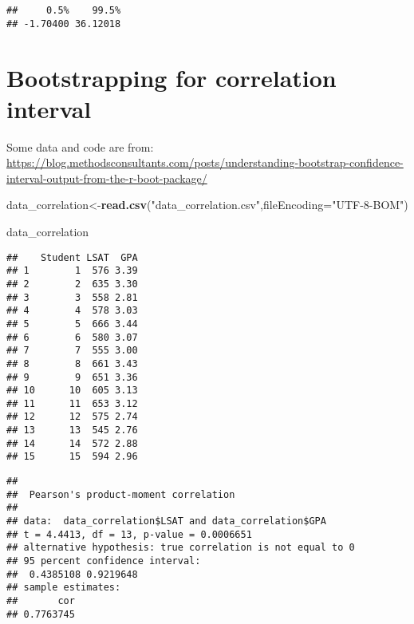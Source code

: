 \documentclass[]{book}
\newenvironment{Shaded}{\begin{snugshade}}{\end{snugshade}}
\newcommand{\DataTypeTok}[1]{\textcolor[rgb]{0.13,0.29,0.53}{#1}}
\newcommand{\KeywordTok}[1]{\textcolor[rgb]{0.13,0.29,0.53}{\textbf{#1}}}
\newcommand{\NormalTok}[1]{#1}
\newcommand{\OperatorTok}[1]{\textcolor[rgb]{0.81,0.36,0.00}{\textbf{#1}}}
\newcommand{\StringTok}[1]{\textcolor[rgb]{0.31,0.60,0.02}{#1}}
\begin{document}
\begin{verbatim}
##     0.5%    99.5% 
## -1.70400 36.12018
\end{verbatim}

\hypertarget{bootstrapping-for-correlation-interval}{%
\section{Bootstrapping for correlation interval}\label{bootstrapping-for-correlation-interval}}

Some data and code are from: \url{https://blog.methodsconsultants.com/posts/understanding-bootstrap-confidence-interval-output-from-the-r-boot-package/}

\begin{Shaded}
\begin{Highlighting}[]
\NormalTok{data_correlation<-}\KeywordTok{read.csv}\NormalTok{(}\StringTok{"data_correlation.csv"}\NormalTok{,}\DataTypeTok{fileEncoding=}\StringTok{"UTF-8-BOM"}\NormalTok{)}

\NormalTok{data_correlation}
\end{Highlighting}
\end{Shaded}

\begin{verbatim}
##    Student LSAT  GPA
## 1        1  576 3.39
## 2        2  635 3.30
## 3        3  558 2.81
## 4        4  578 3.03
## 5        5  666 3.44
## 6        6  580 3.07
## 7        7  555 3.00
## 8        8  661 3.43
## 9        9  651 3.36
## 10      10  605 3.13
## 11      11  653 3.12
## 12      12  575 2.74
## 13      13  545 2.76
## 14      14  572 2.88
## 15      15  594 2.96
\end{verbatim}

\begin{Shaded}
\end{Shaded}

\begin{verbatim}
## 
##  Pearson's product-moment correlation
## 
## data:  data_correlation$LSAT and data_correlation$GPA
## t = 4.4413, df = 13, p-value = 0.0006651
## alternative hypothesis: true correlation is not equal to 0
## 95 percent confidence interval:
##  0.4385108 0.9219648
## sample estimates:
##       cor 
## 0.7763745
\end{verbatim}
\end{document}

